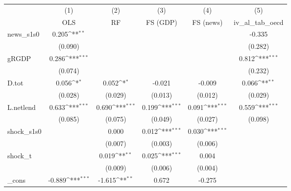 {
\def\sym#1{\ifmmode^{#1}\else\(^{#1}\)\fi}
\begin{tabular}{l*{5}{c}}
\toprule
            &\multicolumn{1}{c}{(1)}&\multicolumn{1}{c}{(2)}&\multicolumn{1}{c}{(3)}&\multicolumn{1}{c}{(4)}&\multicolumn{1}{c}{(5)}\\
            &\multicolumn{1}{c}{OLS}&\multicolumn{1}{c}{RF}&\multicolumn{1}{c}{FS (GDP)}&\multicolumn{1}{c}{FS (news)}&\multicolumn{1}{c}{iv\_al\_tab\_oecd}\\
\midrule
news\_s1s0   &       0.205\sym{**} &                     &                     &                     &      -0.335         \\
            &     (0.090)         &                     &                     &                     &     (0.282)         \\
\addlinespace
gRGDP       &       0.286\sym{***}&                     &                     &                     &       0.812\sym{***}\\
            &     (0.074)         &                     &                     &                     &     (0.232)         \\
\addlinespace
D.tot       &       0.056\sym{*}  &       0.052\sym{*}  &      -0.021         &      -0.009         &       0.066\sym{**} \\
            &     (0.028)         &     (0.029)         &     (0.013)         &     (0.012)         &     (0.029)         \\
\addlinespace
L.netlend   &       0.633\sym{***}&       0.690\sym{***}&       0.199\sym{***}&       0.091\sym{***}&       0.559\sym{***}\\
            &     (0.085)         &     (0.075)         &     (0.049)         &     (0.027)         &     (0.098)         \\
\addlinespace
shock\_s1s0  &                     &       0.000         &       0.012\sym{***}&       0.030\sym{***}&                     \\
            &                     &     (0.007)         &     (0.003)         &     (0.006)         &                     \\
\addlinespace
shock\_t     &                     &       0.019\sym{**} &       0.025\sym{***}&       0.004         &                     \\
            &                     &     (0.009)         &     (0.006)         &     (0.004)         &                     \\
\addlinespace
\_cons      &      -0.889\sym{***}&      -1.615\sym{**} &       0.672         &      -0.275         &                     \\

\end{tabular}}
